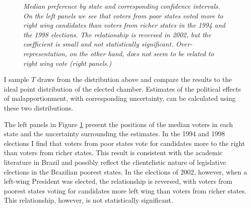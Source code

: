 \begin{figure}
  \centering
  \hspace{.1in}
  \hspace{.1in}
  \hspace{.1in}
  \caption{\emph{Median preference by state and corresponding confidence intervals. On the left panels we see that voters from poor  states voted  more to right wing candidates than voters from richer states in the 1994 and the 1998 elections. The relationship is reversed in 2002, but the coefficient is small and not statistically significant. Over-representation, on the other hand, does not seem to be related to right wing vote (right panels.)}}
    \label{fig:medians}
  \end{figure}

I sample  $T$ draws from the distribution above and compare the results to the ideal point distribution of the elected chamber. Estimates of the political effects of malapportionment, with corresponding uncertainty, can be calculated using these two distributions. %

The left panels in Figure \ref{fig:medians} present the positions of the median voters in each state and the uncertainty surrounding the estimates. In the 1994 and 1998 elections I find that  voters from poor states vote for candidates more to the right than voters from richer states. This result is consistent with the academic literature in Brazil \cite{Desposato:2001} and possibly reflect the clientelistic nature of legislative elections in the Brazilian poorest states. In the elections of 2002, however, when a left-wing President was elected, the relationship is reversed, with voters from poorest states voting for candidates more left wing than voters from richer states. This relationship, however, is not statistically significant. 

